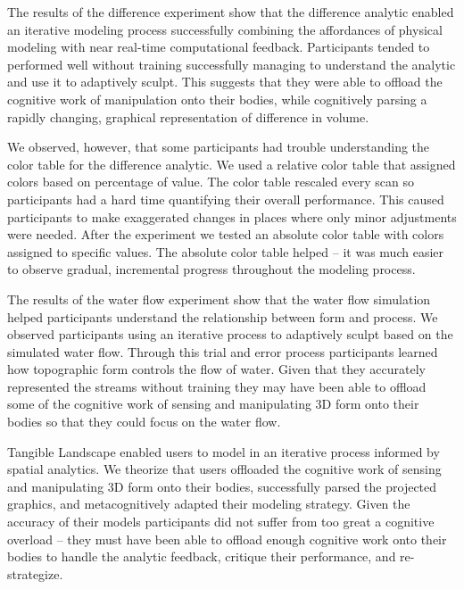 \documentclass[prodmode,acmtochi]{acmsmall} %
\begin{document}

The results of the difference experiment show that 
the difference analytic 
enabled an iterative modeling process
successfully combining the affordances of physical modeling
with near real-time computational feedback. 
%
Participants tended to performed well without training 
successfully managing to %
understand the analytic
and use it to adaptively sculpt.
%
This suggests that they were able to offload the cognitive work 
of manipulation onto their bodies, while cognitively 
parsing a rapidly changing, graphical representation of difference in volume.

We observed, however, that some participants had trouble understanding
the color table for the difference analytic. 
We used a relative color table 
that assigned colors based on percentage of value.
The color table rescaled every scan 
so participants had a hard time quantifying their overall performance.
This caused participants to make exaggerated changes in places
where only minor adjustments were needed.
%
After the experiment we tested an absolute color table
with colors assigned to specific values.
The absolute color table helped -- it was much easier 
to observe gradual, incremental progress throughout the modeling process.


The results of the water flow experiment show 
that the water flow simulation helped participants 
understand the relationship between form and process.
We observed participants using an iterative process
to adaptively sculpt based on the simulated water flow. 
Through this trial and error process 
participants learned how
topographic form controls the flow of water.
%
Given that they accurately represented the streams without training
they may have been able to offload 
some of the cognitive work of sensing and manipulating 
3D form onto their bodies so that 
they could focus on the water flow. 

Tangible Landscape enabled users 
to model in an iterative process informed by spatial analytics. %
%
We theorize that users offloaded the cognitive work 
of sensing and manipulating 3D form onto their bodies,
successfully parsed the projected graphics,
and metacognitively adapted their modeling strategy.
%
Given the accuracy of their models 
participants did not suffer from too great a cognitive overload 
-- they must have been able to offload enough cognitive work onto their bodies
to handle the analytic feedback, critique their performance, and re-strategize.
\end{document}
